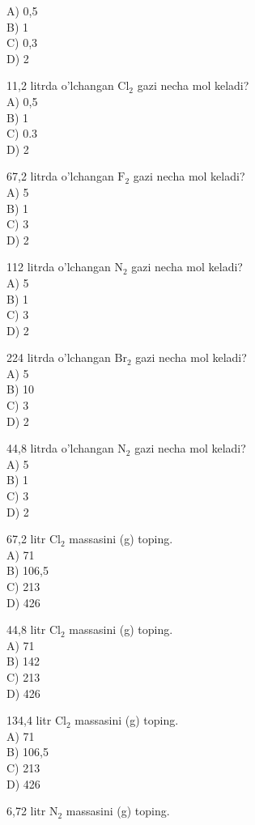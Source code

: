 A) 0,5\\
B) 1\\
C) 0,3\\
D) 2
  \item 11,2 litrda o'lchangan $\mathrm{Cl}_{2}$ gazi necha mol keladi?\\
A) 0,5\\
B) 1\\
C) 0.3\\
D) 2
  \item 67,2 litrda o'lchangan $\mathrm{F}_{2}$ gazi necha mol keladi?\\
A) 5\\
B) 1\\
C) 3\\
D) 2
  \item 112 litrda o'lchangan $\mathrm{N}_{2}$ gazi necha mol keladi?\\
A) 5\\
B) 1\\
C) 3\\
D) 2
  \item 224 litrda o'lchangan $\mathrm{Br}_{2}$ gazi necha mol keladi?\\
A) 5\\
B) 10\\
C) 3\\
D) 2
  \item 44,8 litrda o'lchangan $\mathrm{N}_{2}$ gazi necha mol keladi?\\
A) 5\\
B) 1\\
C) 3\\
D) 2
  \item 67,2 litr $\mathrm{Cl}_{2}$ massasini (g) toping.\\
A) 71\\ 
B) 106,5\\
C) 213\\
D) 426
  \item 44,8 litr $\mathrm{Cl}_{2}$ massasini (g) toping.\\
A) 71\\
B) 142\\
C) 213\\
D) 426
  \item 134,4 litr $\mathrm{Cl}_{2}$ massasini (g) toping.\\
A) 71\\
B) 106,5\\
C) 213\\
D) 426
  \item 6,72 litr $\mathrm{N}_{2}$ massasini (g) toping.\\
